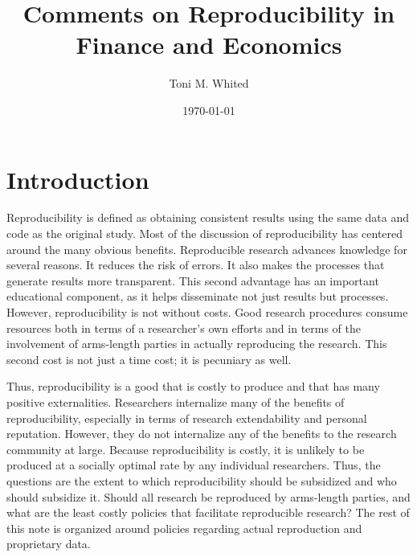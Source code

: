 \documentclass[12pt, oneside]{article}
\begin{document}
 

\title{Comments on Reproducibility in Finance and Economics}


\author{\small \color{black}Toni M. Whited}

\date{\normalsize\today}  


\maketitle
\thispagestyle{empty}

\doublespacing

\section{Introduction} 
Reproducibility is defined as obtaining consistent results using the same data and code as the original study. Most of the discussion of reproducibility has centered around the many obvious benefits. Reproducible research advances knowledge for several reasons. It reduces the risk of errors.  It also makes the processes that generate results more transparent.  This second advantage has an important educational component, as it helps disseminate not just results but processes.  However, reproducibility is not without costs. Good research procedures consume resources both in terms of a researcher's own efforts and in terms of the involvement of arms-length parties in actually reproducing the research.  This second cost is not just a time cost; it is pecuniary as well. 

Thus, reproducibility is a good that is costly to produce and that has many positive externalities.  Researchers internalize many of the benefits of reproducibility, especially in terms of research extendability and personal reputation. However, they do not internalize any of the benefits to the research community at large.  Because reproducibility is costly, it is unlikely to be produced at a socially optimal rate by any individual researchers. Thus, the questions are the extent to which reproducibility should be subsidized and who should subsidize it. Should all research be reproduced by arms-length parties, and %
what are the least costly policies that facilitate reproducible research?  The rest of this note is organized around policies regarding actual reproduction and proprietary data. 
\end{document}
